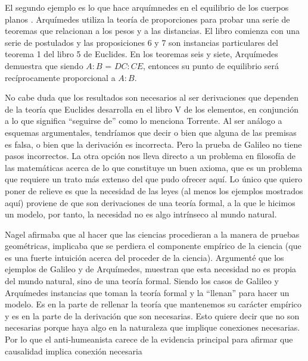 El segundo ejemplo es lo que hace arquímnedes en el equilibrio de los cuerpos planos \cite{Archimedes1897}. Arquímedes utiliza la teoría de proporciones para probar una serie de teoremas que relacionan a los pesos y a las distancias. El libro comienza con una serie de postulados y las proposiciones 6 y 7 son instancias particulares del teorema 1 del libro 5 de Euclides. En los teoremas seis y siete, Arquímedes demuestra que siendo $A:B$ = $DC:CE$, entonces su punto de equilibrio será recíprocamente proporcional a $A:B$.

No cabe duda que los resultados son necesarios al ser derivaciones que dependen de la teoría que Euclides desarrolla en el libro V de los elementos, en conjunción a lo que significa ``seguirse de'' como lo menciona Torrente. Al ser análogo a esquemas argumentales, tendríamos que decir o bien que alguna de las premisas es falsa, o bien que la derivación es incorrecta. Pero la prueba de Galileo no tiene pasos incorrectos. La otra opción nos lleva directo a un problema en filosofía de las matemáticas acerca de lo que constituye un buen axioma, que es un problema que requiere un trato más extenso del que pudo ofrecer aquí. Lo único que quiero poner de relieve es que la necesidad de las leyes (al menos los ejemplos mostrados aquí) proviene de que son derivaciones de una teoría formal, a la que le hicimos un modelo, por tanto, la necesidad no es algo intrínseco al mundo natural.


Nagel afirmaba que al hacer que las ciencias procedieran a la manera de pruebas geométricas, implicaba que se perdiera el componente empírico de la ciencia (que es una fuerte intuición acerca del proceder de la ciencia). Argumenté que los ejemplos de Galileo y de Arquímedes, muestran que esta necesidad no es propia del mundo natural, sino de una teoría formal. Siendo los casos de Galileo y Arquímedes instancias que toman la teoría formal y la ``llenan'' para hacer un modelo. Es en la parte de rellenar la teoría que mantenemos su carácter empírico y es en la parte de la derivación que son necesarias. Esto quiere decir que no son necesarias porque haya algo en la naturaleza que implique conexiones necesarias. Por lo que el anti-humeanista carece de la evidencia principal para afirmar que causalidad implica conexión necesaria

